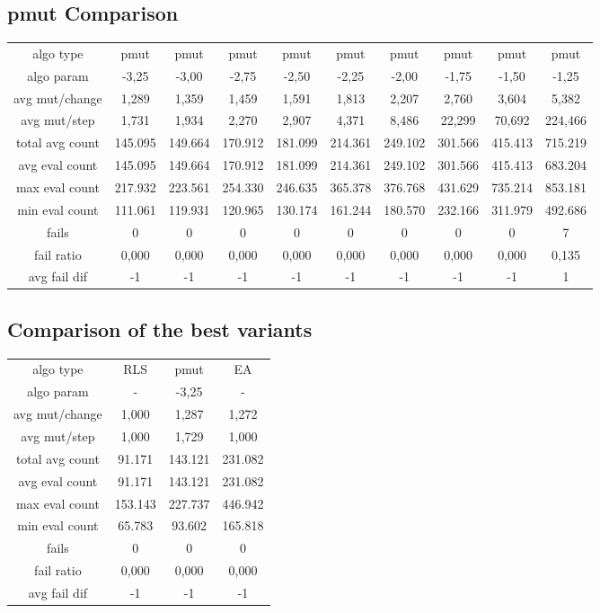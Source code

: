 \subsection{pmut Comparison}

\begin{tabular}[h]{cccccccccc}
algo type&           pmut&    pmut&    pmut&    pmut&    pmut&    pmut&    pmut&    pmut&    pmut\\
algo param&         -3,25&   -3,00&   -2,75&   -2,50&   -2,25&   -2,00&   -1,75&   -1,50&   -1,25\\
avg mut/change&     1,289&   1,359&   1,459&   1,591&   1,813&   2,207&   2,760&   3,604&   5,382\\
avg mut/step&       1,731&   1,934&   2,270&   2,907&   4,371&   8,486&  22,299&  70,692& 224,466\\
\hline
total avg count&  145.095& 149.664& 170.912& 181.099& 214.361& 249.102& 301.566& 415.413& 715.219\\
avg eval count&   145.095& 149.664& 170.912& 181.099& 214.361& 249.102& 301.566& 415.413& 683.204\\
max eval count&   217.932& 223.561& 254.330& 246.635& 365.378& 376.768& 431.629& 735.214& 853.181\\
min eval count&   111.061& 119.931& 120.965& 130.174& 161.244& 180.570& 232.166& 311.979& 492.686\\
\hline
fails&                  0&       0&       0&       0&       0&       0&       0&       0&       7\\
fail ratio&         0,000&   0,000&   0,000&   0,000&   0,000&   0,000&   0,000&   0,000&   0,135\\
avg fail dif&          -1&      -1&      -1&      -1&      -1&      -1&      -1&      -1&       1\\
\end{tabular}

\subsection{Comparison of the best variants}

\begin{tabular}[h]{cccc}
algo type&            RLS&    pmut&      EA\\
algo param&             -&   -3,25&       -\\
avg mut/change&     1,000&   1,287&   1,272\\
avg mut/step&       1,000&   1,729&   1,000\\
\hline
total avg count&   91.171& 143.121& 231.082\\
avg eval count&    91.171& 143.121& 231.082\\
max eval count&   153.143& 227.737& 446.942\\
min eval count&    65.783&  93.602& 165.818\\
\hline
fails&                  0&       0&       0\\
fail ratio&         0,000&   0,000&   0,000\\
avg fail dif&          -1&      -1&      -1\\
\end{tabular}


